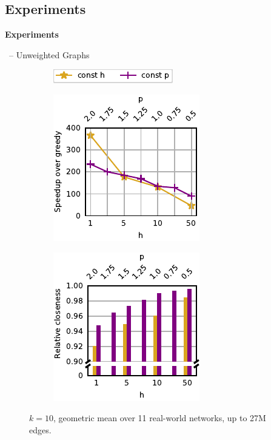 \documentclass[10pt,titlepage,english,presentation]{beamer}
\begin{document}
\subsection{Experiments}

\begin{frame}
\centering
\vfill\Huge\textbf{\textcolor{HUBblue}{Experiments}}\vfill
\end{frame}

\begin{frame}[t]{\growshrink\ -- Unweighted Graphs}
\small
\begin{figure}
\centering
\begin{subfigure}[t]{\textwidth}
\centering
\includegraphics{../sources/plots/local-search-heu/legend-h-p-params.pdf}
\end{subfigure}\smallskip

\begin{subfigure}[t]{.5\textwidth}
\centering
\includegraphics{../sources/plots/local-search-heu/speedups-h-p-params.pdf}
\end{subfigure}\hfill
\begin{subfigure}[t]{.5\textwidth}
\centering
\includegraphics{../sources/plots/local-search-heu/quality-h-p-params.pdf}
\end{subfigure}
\caption*{\footnotesize $k = 10$, geometric mean over 11 real-world networks, up to 27M edges.}
\end{figure}


\end{frame}
\end{document}
